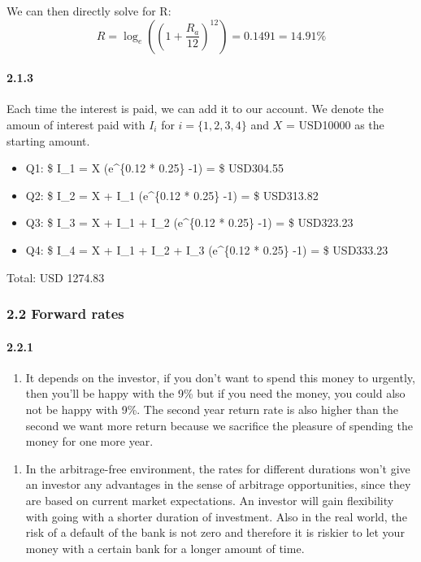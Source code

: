 \documentclass[11pt]{article}
\providecommand{\tightlist}{%
      \setlength{\itemsep}{0pt}\setlength{\parskip}{0pt}}
\begin{document}
    We can then directly solve for R:
\[ R=\log_{e}((1+\frac{R_a}{12})^{12})=0.1491=14.91 \% \]

    \hypertarget{section}{%
\paragraph{2.1.3}\label{section}}

    Each time the interest is paid, we can add it to our account. We denote
the amoun of interest paid with \(I_i\) for \(i = \{1,2,3,4\}\) and
\(X\) = USD10000 as the starting amount.

    \begin{itemize}
\tightlist
\item
  Q1: \$ I\_1 = X \times (e\^{}\{0.12 * 0.25\} -1) = \$ USD304.55
\item
  Q2: \$ I\_2 = X + I\_1 \times (e\^{}\{0.12 * 0.25\} -1) = \$ USD313.82
\item
  Q3: \$ I\_3 = X + I\_1 + I\_2 \times (e\^{}\{0.12 * 0.25\} -1) = \$
  USD323.23
\item
  Q4: \$ I\_4 = X + I\_1 + I\_2 + I\_3 \times (e\^{}\{0.12 * 0.25\} -1)
  = \$ USD333.23
\end{itemize}

Total: USD 1274.83

    \hypertarget{forward-rates}{%
\subsubsection{2.2 Forward rates}\label{forward-rates}}

    \hypertarget{section}{%
\paragraph{2.2.1}\label{section}}

    \begin{enumerate}
\def\labelenumi{\alph{enumi})}
\tightlist
\item
  It depends on the investor, if you don't want to spend this money to
  urgently, then you'll be happy with the 9\% but if you need the money,
  you could also not be happy with 9\%. The second year return rate is
  also higher than the second we want more return because we sacrifice
  the pleasure of spending the money for one more year.
\end{enumerate}

    \begin{enumerate}
\def\labelenumi{\alph{enumi})}
\setcounter{enumi}{1}
\tightlist
\item
  In the arbitrage-free environment, the rates for different durations
  won't give an investor any advantages in the sense of arbitrage
  opportunities, since they are based on current market expectations. An
  investor will gain flexibility with going with a shorter duration of
  investment. Also in the real world, the risk of a default of the bank
  is not zero and therefore it is riskier to let your money with a
  certain bank for a longer amount of time.
\end{enumerate}
\end{document}

